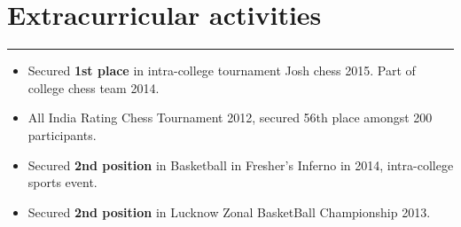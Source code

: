 \documentclass[a4paper]{article}
\begin{document}
\section*{Extracurricular activities}
\hrule
\vspace{3mm}
\begin{itemize}
	\setlength\itemsep{-0.2em}
	\item Secured \textbf{1st place} in intra-college tournament Josh chess 2015. Part of college chess team 2014.
	\item All India Rating Chess Tournament 2012, secured 56th place amongst 200 participants.
	\item Secured \textbf{2nd position} in Basketball in Fresher’s Inferno in 2014, intra-college sports event.
	\item Secured \textbf{2nd position} in Lucknow Zonal BasketBall Championship 2013.
\end{itemize}
\end{document}
